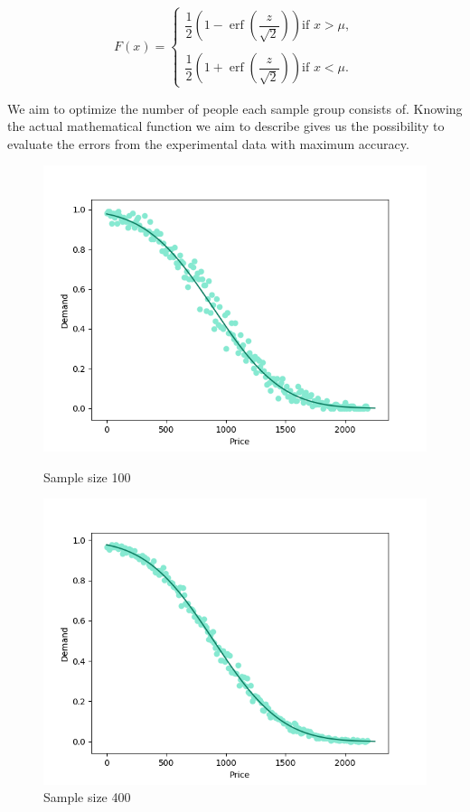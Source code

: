 \documentclass[11pt, a4paper]{article}
\theoremstyle{definition}
\begin{document}
			$$
			F(x)=
			\begin{cases}
				\dfrac{1}{2}\left (1-\operatorname{erf}\left (\dfrac{z}{\sqrt{2}}\right )\right ) \text{if } x>\mu,\\
				\\
				\dfrac{1}{2}\left (1+\operatorname{erf}\left (\dfrac{z}{\sqrt{2}}\right )\right ) \text{if } x<\mu.
			\end{cases}
			$$\par
			We aim to optimize the number of people each sample group consists of. Knowing the actual mathematical function we aim to describe gives us the possibility to evaluate the errors from the experimental data with maximum accuracy.
			\begin{figure}[H]
				\begin{minipage}{0.48\textwidth}
					\centering
					\includegraphics[width=\linewidth]{Exp_and_math_100}
					\caption{Sample size 100}\label{Fig:Data3}
				\end{minipage}\hfill
				\begin{minipage}{0.48\textwidth}
					\centering
					\includegraphics[width=\linewidth]{Exp_and_math_400}
					\caption{Sample size 400}\label{Fig:Data4}
				\end{minipage}
			\end{figure}\par\noindent
\end{document}
